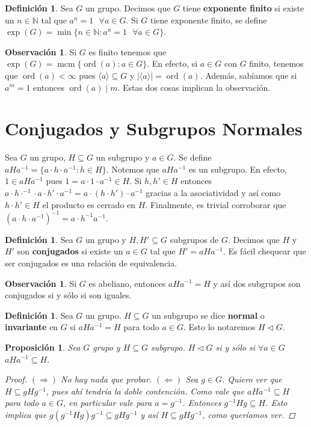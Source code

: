 \documentclass[12pt]{book}
\newtheorem{prop}[teo]{Proposición}
\theoremstyle{definition}
\newtheorem{obs}[teo]{Observación}
\newtheorem{defn}[teo]{Definición}
\newcommand{\NN}{\mathbb{N}}
\DeclareMathOperator{\mcm}{mcm}
\DeclareMathOperator{\ord}{ord}
\begin{document}
\begin{defn}
Sea $G$ un grupo. Decimos que $G$ tiene \textbf{exponente finito} si existe un $n\in\NN$ tal que $a^n = 1\text{ }\forall a\in G$. Si $G$ tiene exponente finito, se define $\exp(G) = \min \{n\in \NN : a^n = 1 \text{ }\forall a\in G\}$.
\end{defn}
\begin{obs}
Si $G$ es finito tenemos que $\exp(G) = \mcm\{\ord(a) : a\in G\}$. En efecto, si $a\in G$ con $G$ finito, tenemos que $\ord(a)<\infty$ pues $\langle a\rangle \subseteq G$ y $|\langle a\rangle | = \ord(a)$. Además, sabíamos que si $a^m = 1$ entonces $\ord(a)\mid m$. Estas dos cosas implican la observación.
\end{obs}

\section{Conjugados y Subgrupos Normales}

Sea $G$ un grupo, $H\subseteq G$ un subgrupo y $a\in G$. Se define $aHa^{-1}=\{a\cdot h\cdot a^{-1} : h\in H\}$. Notemos que $aHa^{-1}$ es un subgrupo. En efecto, $1\in aHa^{-1}$ pues $1 = a\cdot 1 \cdot a^{-1} \in H$. Si $h,h'\in H$ entonces $a\cdot h\cdot^{-1} \cdot a \cdot h'\cdot a^{-1} = a \cdot (h\cdot h')\cdot a^{-1}$ gracias a la asociatividad y así como $h\cdot h' \in H$ el producto es cerrado en $H$. Finalmente, es trivial corroborar que $(a\cdot h\cdot a^{-1})^{-1} = a \cdot h^{-1} a^{-1}$.

\begin{defn}
Sea $G$ un grupo y $H,H'\subseteq G$ subgrupos de $G$. Decimos que $H$ y $H'$ son \textbf{conjugados} si existe un $a\in G$ tal que $H' = aHa^{-1}$. Es fácil chequear que ser conjugados es una relación de equivalencia.
\end{defn}

\begin{obs}
Si $G$ es abeliano, entonces $aHa^{-1}=H$ y así dos subgrupos son conjugados si y sólo si son iguales.
\end{obs}

\begin{defn}
Sea $G$ un grupo. $H\subseteq G$ un subgrupo se dice \textbf{normal} o \textbf{invariante} en $G$ si $aHa^{-1}=H$ para todo $a\in G$. Esto lo notaremos $H\triangleleft G$.
\end{defn}

\begin{prop}
Sea $G$ grupo y $H\subseteq G$ subgrupo. $H\triangleleft G$ si y sólo si $\forall a\in G$ $aHa^{-1}\subseteq H$.
\begin{proof}
$(\Longrightarrow)$ No hay nada que probar.
$(\Longleftarrow)$ Sea $g\in G$. Quiero ver que $H\subseteq gHg^{-1}$, pues ahí tendría la doble contención. Como vale que $aHa^{-1}\subseteq H$ para todo $a\in G$, en particular vale para $a=g^{-1}$. Entonces $g^{-1}Hg\subseteq H$. Esto implica que $g(g^{-1}Hg)g^{-1}\subseteq gHg^{-1}$ y así $H\subseteq gHg^{-1}$, como queríamos ver.
\end{proof}
\end{prop}
\end{document}
